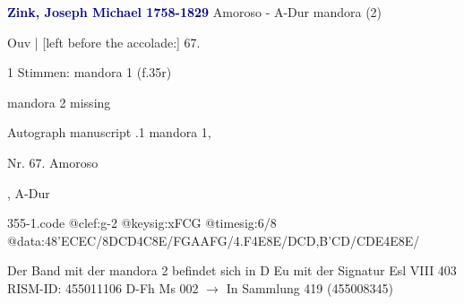 \documentclass[twocolumn]{book}
\begin{document}
\newline \par \vspace{7pt} \textcolor{darkblue}{\textbf{Zink, Joseph Michael  1758-1829}}
\newline Amoroso - A-Dur
\newline mandora (2)
\newline \begin{itshape}[f.35r, at left:] Ouv | [left before the accolade:] 67.\end{itshape} 
\newline \textcolor{darkblue}{}  1 Stimmen: mandora 1  (f.35r)
\newline \begin{small} mandora 2 missing\end{small} 
\newline Autograph manuscript
.1  mandora 1, \begin{itshape}Nr. 67. Amoroso\end{itshape}, A-Dur  
\begin{filecontents*}{355-1.code}
@clef:g-2
@keysig:xFCG
@timesig:6/8
@data:48'ECEC/8DCD4C8E/FGAAFG/4.F4E8E/DCD,B'CD/CDE4E8E/
\end{filecontents*}
\newline
%
\newline Der Band mit der mandora 2 befindet sich in D Eu mit der Signatur Esl VIII 403
\newline RISM-ID: 455011106
\newline D-Fh  Ms 002
\newline $\rightarrow$ In Sammlung 419 (455008345)
      
\end{document}
